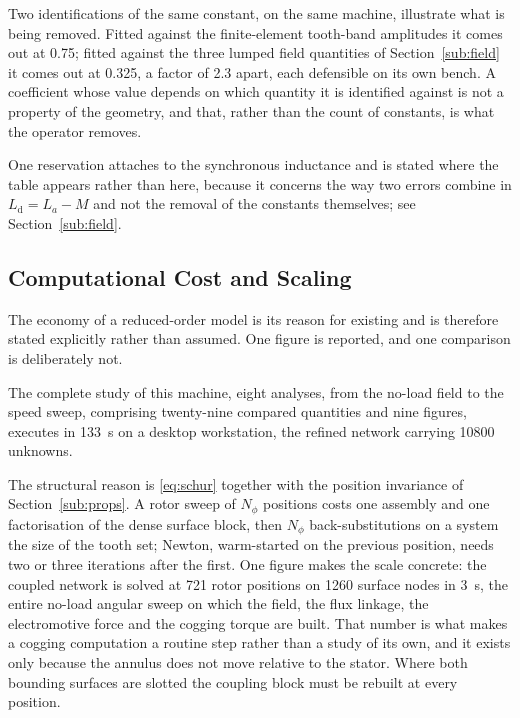 \documentclass[10pt,a4paper,twocolumn]{article}
\theoremstyle{plain}
\theoremstyle{remark}
\begin{document}
Two identifications of the same constant, on the same machine, illustrate
what is being removed. Fitted against the finite-element tooth-band
amplitudes it comes out at \num{0.75}; fitted against the three lumped
field quantities of Section~\ref{sub:field} it comes out at
\num{0.325}, a factor of \num{2.3} apart, each defensible on its own
bench. A coefficient whose value depends on which quantity it is
identified against is not a property of the geometry, and that, rather
than the count of constants, is what the operator removes.

One reservation attaches to the synchronous inductance and is stated
where the table appears rather than here, because it concerns the way
two errors combine in $L_{\mathrm{d}}=L_a-M$ and not the removal of the
constants themselves; see Section~\ref{sub:field}.

\subsection{Computational Cost and Scaling}
\label{sub:compcost}

The economy of a reduced-order model is its reason for existing and is
therefore stated explicitly rather than assumed. One figure is reported,
and one comparison is deliberately not.

The complete study of this machine, eight analyses, from the no-load
field to the speed sweep, comprising twenty-nine compared quantities and
nine figures, executes in \SI{133}{\second} on a desktop workstation,
the refined network carrying \num{10800} unknowns.

The structural reason is \eqref{eq:schur} together with the position
invariance of Section~\ref{sub:props}. A rotor sweep of $N_\phi$
positions costs one assembly and one factorisation of the dense surface
block, then $N_\phi$ back-substitutions on a system the size of the
tooth set; Newton, warm-started on the previous position, needs two or
three iterations after the first. One figure makes the scale concrete:
the coupled network is solved at \num{721} rotor positions on \num{1260}
surface nodes in \SI{3}{\second}, the entire no-load angular sweep on
which the field, the flux linkage, the electromotive force and the
cogging torque are built. That number is what makes a cogging
computation a routine step rather than a study of its own, and it exists
only because the annulus does not move relative to the stator. Where
both bounding surfaces are slotted the coupling block must be rebuilt at
every position.
\end{document}
